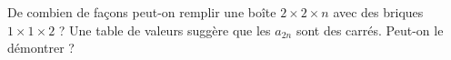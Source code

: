De combien de façons peut-on remplir une boîte $2 \times 2 \times n$ avec des briques $1 \times 1 \times 2$ ? Une table de valeurs suggère que les $a_{2n}$ sont des carrés. Peut-on le démontrer ?

